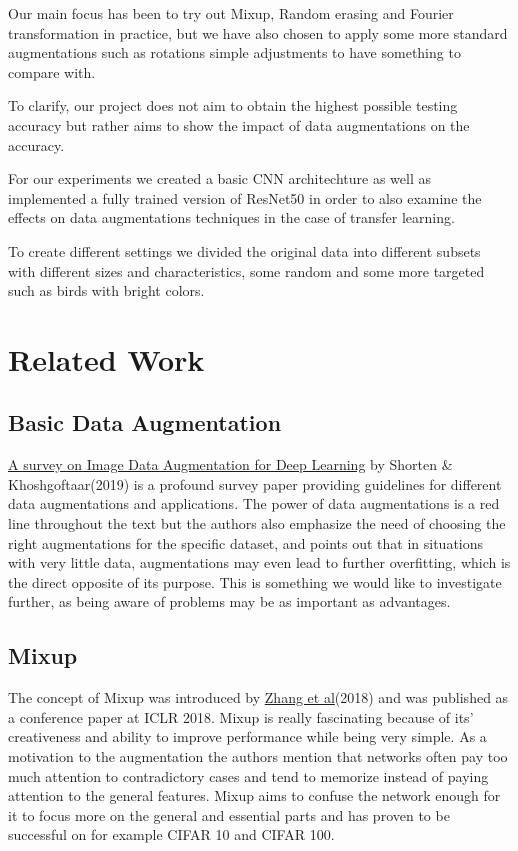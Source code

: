 \documentclass{article}
\begin{document}
Our main focus has been to try out Mixup, Random erasing and Fourier transformation in practice, but we have also chosen to apply some more standard augmentations such as rotations simple adjustments to have something to compare with.

To clarify, our project does not aim to obtain the highest possible testing accuracy but rather aims to show the impact of data augmentations 
on the accuracy. 

For our experiments we created a basic CNN architechture as well as implemented a fully trained version of ResNet50 in order to also examine the effects on data augmentations techniques in the case of transfer learning.

To create different settings we divided the original data into different subsets with different sizes and characteristics, some random and some more targeted such as birds with bright colors.

\section{Related Work}

\subsection{Basic Data Augmentation}

\href{https://link.springer.com/article/10.1186/s40537-019-0197-0}{A survey on Image Data Augmentation for Deep Learning} by Shorten \& Khoshgoftaar(2019) is a profound survey paper providing guidelines for different data augmentations and applications. The power of data augmentations is a red line throughout the text but the authors also emphasize the need of choosing the right augmentations for the specific dataset, and points out that in situations with very little data, augmentations may even lead to further overfitting, which is the direct opposite of its purpose. This is something we would like to investigate further, as being aware of problems may be as important as advantages.


\subsection{Mixup}

The concept of Mixup was introduced by \href{https://arxiv.org/pdf/1710.09412.pdf}{Zhang et al}(2018) and was published as a conference paper at ICLR 2018. Mixup is really fascinating because of its' creativeness and ability to improve performance while being very simple. As a motivation to the augmentation the authors mention that networks often pay too much attention to contradictory cases and tend to memorize instead of paying attention to the general features. Mixup aims to confuse the network enough for it to focus more on the general and essential parts and has proven to be successful on for example CIFAR 10 and CIFAR 100.
\end{document}
